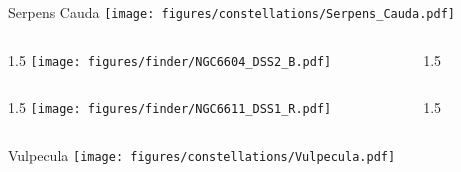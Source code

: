 \documentclass[final]{beamer}
\newlength{\colwidth}
\begin{document}

\begin{frame}[t]{\LARGE Serpens Cauda}
  \centering
  \texttt{[image: figures/constellations/Serpens\_Cauda.pdf]}
\end{frame}


\begin{frame}[t]{}
  \begin{columns}[T]
    \begin{column}{1.5\colwidth}
      \centering
      \texttt{[image: figures/finder/NGC6604\_DSS2\_B.pdf]}
    \end{column}
    \begin{column}{1.5\colwidth}
      \Large
      
    \end{column}
  \end{columns}
  \vspace{\fill}
  \begin{columns}[T]
    \begin{column}{1.5\colwidth}
      \centering
      \texttt{[image: figures/finder/NGC6611\_DSS1\_R.pdf]}
    \end{column}
    \begin{column}{1.5\colwidth}
      \Large
      
    \end{column}
  \end{columns}
\end{frame}


\begin{frame}[t]{\LARGE Vulpecula}
  \centering
  \texttt{[image: figures/constellations/Vulpecula.pdf]}
\end{frame}

\end{document}
